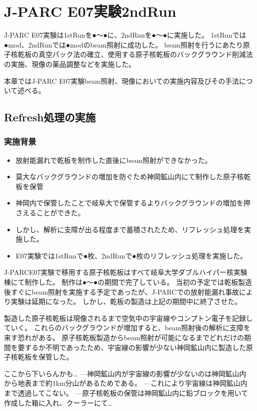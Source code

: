 \documentclass[12pt,a4paper]{jarticle}
\begin{document}
\newpage
\section{J-PARC E07実験2ndRun}
J-PARC E07実験は1stRunを●～●に、2ndRunを●～●に実施した。
1stRunでは●mod、2ndRunでは●modのbeam照射に成功した。
beam照射を行うにあたり原子核乾板の真空パック法の確立、使用する原子核乾板のバックグラウンド削減法の実施、現像の薬品調整などを実施した。
\par
本章ではJ-PARC E07実験beam照射、現像においての実施内容及びその手法について述べる。
\subsection{Refresh処理の実施}
\subsubsection{実施背景}
\begin{itemize}
 \item 放射能漏れで乾板を制作した直後にbeam照射ができなかった。
 \item 莫大なバックグラウンドの増加を防ぐため神岡鉱山内にて制作した原子核乾板を保管
 \item 神岡内で保管したことで岐阜大で保管するよりバックグラウンドの増加を押さえることができた。
 \item しかし、解析に支障が出る程度まで蓄積されたため、リフレッシュ処理を実施した。
 \item E07実験では1stRunで●枚、2ndRunで●枚のリフレッシュ処理を実施した。
\end{itemize}
J-PARCE07実験で移用する原子核乾板はすべて岐阜大学ダブルハイパー核実験棟にて制作した。
制作は●～●の期間で完了している。
当初の予定では乾板製造後すぐにbeam照射を実施する予定であったが、J-PARCでの放射能漏れ事故により実験は延期になった。
しかし、乾板の製造は上記の期間中に終了させた。
\par
製造した原子核乾板は現像されるまで空気中の宇宙線やコンプトン電子を記録していく。
これらのバックグラウンドが増加すると、beam照射後の解析に支障を来す恐れがある。
原子核乾板製造からbeam照射が可能になるまでどれだけの期間を要するか不明であったため、宇宙線の影響が少ない神岡鉱山内に製造した原子核乾板を保管した。
\par
ここから下いらんかも…
---神岡鉱山内が宇宙線の影響が少ないのは神岡鉱山内から地表まで約1km分山があるためである。
---これにより宇宙線は神岡鉱山内まで透過してこない。
---原子核乾板の保管は神岡鉱山内に鉛ブロックを用いて作成した箱に入れ、クーラーにて…
\par
\end{document}
